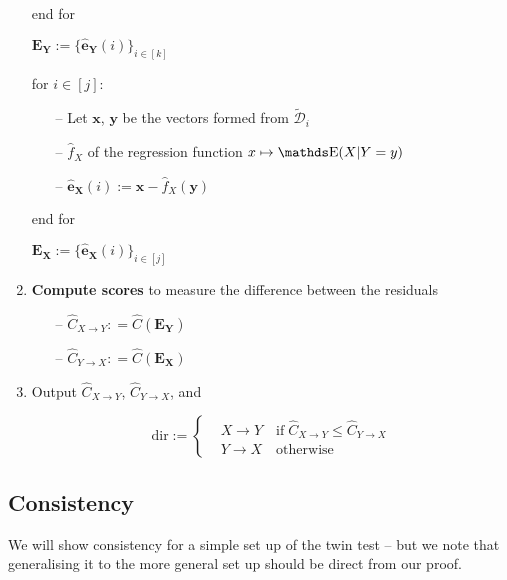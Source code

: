 \begin{algorithm}[H]
\begin{enumerate}
        end for

        $\mathbf{E_Y} := \{ \mathbf{\hat{e}_{Y}}(i) \}_{i \in [k]} $

        for $i \in [j]:$

        \begin{itemize}
            \item[--] Let $\mathbf{x}$, $\mathbf{y}$ be the vectors formed from $\tilde{\mathcal{D}}_i$
            \item[--] $\hat{f}_X$ of the regression function $x \mapsto \E(X | Y=y)$
            \item[--] $ \mathbf{\hat{e}_{X}}(i) := \mathbf{x} - \hat{f}_X(\mathbf{y})$
        \end{itemize}

        end for

        $\mathbf{E_X} := \{ \mathbf{\hat{e}_{X}}(i) \}_{i \in [j]} $

        \item \textbf{Compute scores} to measure the difference between the residuals
        \begin{itemize}
            \item[--] $\hat{C}_{X \rightarrow Y}: = \hat{C}( \mathbf{E_Y} )$ 
            \item[--] $\hat{C}_{Y \rightarrow X}: = \hat{C}( \mathbf{E_X} )$
        \end{itemize}        

        \item Output $\hat{C}_{X \rightarrow Y}$, $\hat{C}_{Y \rightarrow X}$, and
        
        \[ 
        \text{dir} :=  
         \begin{cases} 
            & X \rightarrow Y \quad \text{if} \; \hat{C}_{X \rightarrow Y} \leq \hat{C}_{Y \rightarrow X}\\
            & Y \rightarrow X \quad \text{otherwise}
         \end{cases}
        \]
        
    \end{enumerate}

  \label{alg:twin_test}
  \end{algorithm}


\subsection{Consistency}

We will show consistency for a simple set up of the twin test -- but we note that generalising it to the more 
general set up should be direct from our proof. 


